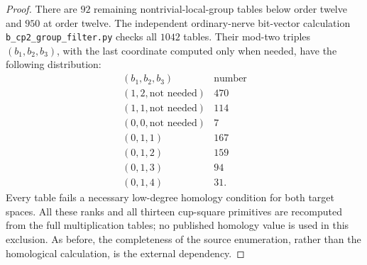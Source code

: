 \begin{proof}
There are $92$ remaining nontrivial-local-group tables below order
twelve and $950$ at order twelve.  The independent ordinary-nerve
bit-vector calculation \texttt{b\_cp2\_group\_filter.py} checks
all $1042$ tables.  Their mod-two triples $(b_1,b_2,b_3)$, with
the last coordinate computed only when needed, have the following
distribution:
\[
\begin{array}{c|r}
(b_1,b_2,b_3)&\text{number}\\\hline
(1,2,\text{not needed})&470\\
(1,1,\text{not needed})&114\\
(0,0,\text{not needed})&7\\
(0,1,1)&167\\
(0,1,2)&159\\
(0,1,3)&94\\
(0,1,4)&31.
\end{array}
\]
Every table fails a necessary low-degree homology condition for both
target spaces.  All these ranks and all thirteen cup-square primitives
are recomputed from the full multiplication tables; no published
homology value is used in this exclusion.  As before, the completeness
of the source enumeration, rather than the homological calculation,
is the external dependency.
\end{proof}

